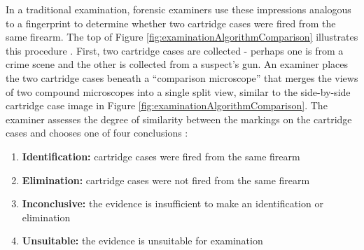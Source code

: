 \documentclass[11pt,]{isuthesis}
\begin{document}
In a traditional examination, forensic examiners use these impressions analogous to a fingerprint to determine whether two cartridge cases were fired from the same firearm.
The top of Figure \ref{fig:examinationAlgorithmComparison} illustrates this procedure \citep{xiaoHui_seminar, Zheng2014, Vorburger2015}.
First, two cartridge cases are collected - perhaps one is from a crime scene and the other is collected from a suspect's gun.
An examiner places the two cartridge cases beneath a ``comparison microscope'' that merges the views of two compound microscopes into a single split view, similar to the side-by-side cartridge case image in Figure \ref{fig:examinationAlgorithmComparison}.
The examiner assesses the degree of similarity between the markings on the cartridge cases and chooses one of four conclusions \citet{AFTE1992}:

\begin{enumerate}
\def\labelenumi{\arabic{enumi}.}
\item
  \textbf{Identification:} cartridge cases were fired from the same firearm
\item
  \textbf{Elimination:} cartridge cases were not fired from the same firearm
\item
  \textbf{Inconclusive:} the evidence is insufficient to make an identification or elimination
\item
  \textbf{Unsuitable:} the evidence is unsuitable for examination
\end{enumerate}
\end{document}
